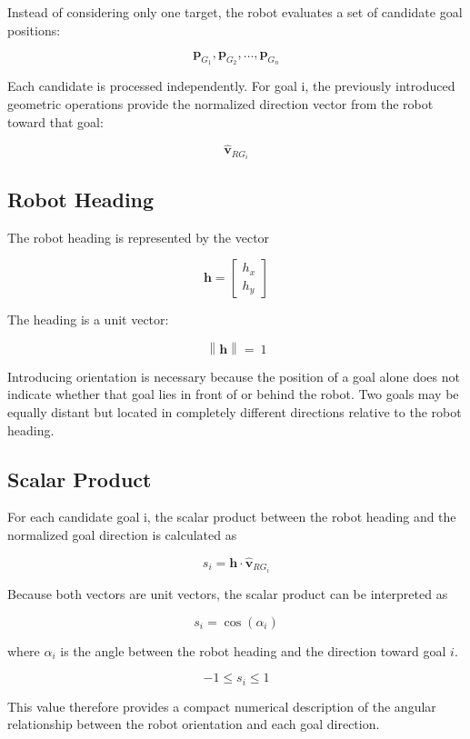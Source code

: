 \documentclass[10pt,twocolumn,a4paper]{article}
\begin{document}
Instead of considering only one target, the robot evaluates a 
set of candidate goal positions:

\[
\mathbf{p}_{G_1}, \mathbf{p}_{G_2}, \ldots, \mathbf{p}_{G_n}
\]

Each candidate is processed independently. For goal i, the previously 
introduced geometric operations provide the normalized direction 
vector from the robot toward that goal:

\[
\hat{\mathbf{v}}_{RG_i}
\]

\subsection{Robot Heading}

The robot heading is represented by the vector

\[
\mathbf{h} =
\begin{bmatrix}
h_x \\
h_y
\end{bmatrix}
\]

The heading is a unit vector:

\[
\mathbf{\left\lVert \mathbf{h} \right\rVert} =
\
1
\]

Introducing orientation is necessary because the 
position of a goal alone does not indicate whether 
that goal lies in front of or behind the robot. 
Two goals may be equally distant but located in 
completely different directions relative to the robot heading.

\subsection{Scalar Product}

For each candidate goal i, the scalar product between the 
robot heading and the normalized goal direction is calculated as

\[
s_i = \mathbf{h} \cdot \hat{\mathbf{v}}_{RG_i}
\]

Because both vectors are unit vectors, the scalar product can 
be interpreted as

\[
s_i = \cos(\alpha_i)
\]

where $\alpha_i$ is the angle between the robot heading and 
the direction toward goal $i$.

\[
-1 \leq s_i \leq 1
\]

This value therefore provides a compact numerical 
description of the angular relationship between the 
robot orientation and each goal direction.
\end{document}

